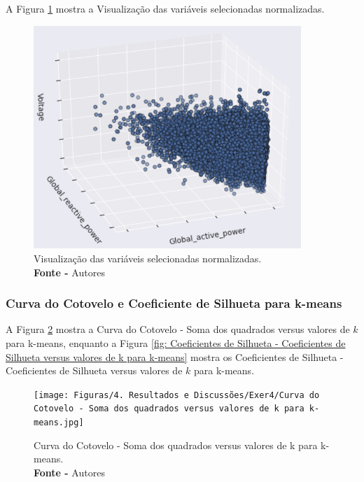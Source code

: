 A Figura \ref{fig: Visualização das variáveis selecionadas normalizadas} mostra a Visualização das variáveis selecionadas normalizadas.
\begin{figure}[H]
    \centering
    \includegraphics[width=0.90\textwidth]{Figuras/4. Resultados e Discussões/Exer4/Visualização das variáveis selecionadas normalizadas.jpg}
    \caption{Visualização das variáveis selecionadas normalizadas.\\ \textbf{Fonte -} Autores}
    \label{fig: Visualização das variáveis selecionadas normalizadas}
\end{figure}



\subsubsection{Curva do Cotovelo e Coeficiente de Silhueta para k-means}

A Figura \ref{fig: Curva do Cotovelo - Soma dos quadrados versus valores de k para k-means} mostra a Curva do Cotovelo - Soma dos quadrados versus valores de $k$ para k-means, enquanto a Figura \ref{fig: Coeficientes de Silhueta - Coeficientes de Silhueta versus valores de k para k-means} mostra os Coeficientes de Silhueta - Coeficientes de Silhueta versus valores de $k$ para k-means.

\begin{figure}[H]
    \centering
    \texttt{[image: Figuras/4. Resultados e Discussões/Exer4/Curva do Cotovelo - Soma dos quadrados versus valores de k para k-means.jpg]}
    \caption{Curva do Cotovelo - Soma dos quadrados versus valores de k para k-means.\\ \textbf{Fonte -} Autores}
    \label{fig: Curva do Cotovelo - Soma dos quadrados versus valores de k para k-means}
\end{figure}

